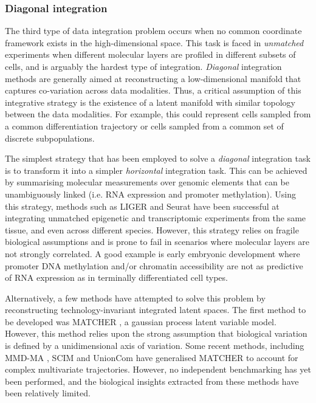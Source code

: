 \subsubsection{Diagonal integration}

The third type of data integration problem occurs when no common coordinate framework exists in the high-dimensional space. This task is faced in \textit{unmatched} experiments when different molecular layers are profiled in different subsets of cells, and is arguably the hardest type of integration. \textit{Diagonal} integration methods are generally aimed at reconstructing a low-dimensional manifold that captures co-variation across data modalities. Thus, a critical assumption of this integrative strategy is the existence of a latent manifold with similar topology between the data modalities. For example, this could represent cells sampled from a common differentiation trajectory or cells sampled from a common set of discrete subpopulations.

The simplest strategy that has been employed to solve a \textit{diagonal} integration task is to transform it into a simpler \textit{horizontal} integration task. This can be achieved by summarising molecular measurements over genomic elements that can be unambiguously linked (i.e. RNA expression and promoter methylation). Using this strategy, methods such as LIGER \cite{Welch2019} and Seurat \cite{Stuart2019b} have been successful at integrating unmatched epigenetic and transcriptomic experiments from the same tissue, and even across different species. However, this strategy relies on fragile biological assumptions and is prone to fail in scenarios where molecular layers are not strongly correlated. A good example is early embryonic development where promoter DNA methylation and/or chromatin accessibility are not as predictive of RNA expression \cite{Argelaguet2019} as in terminally differentiated cell types. 

Alternatively, a few methods have attempted to solve this problem by reconstructing technology-invariant integrated latent spaces. The first method to be developed was MATCHER \cite{Welch2017}, a gaussian process latent variable model. However, this method relies upon the strong assumption that biological variation is defined by a unidimensional axis of variation. Some recent methods, including MMD-MA \cite{Liu2019a}, SCIM \cite{Stark2020} and UnionCom \cite{Cao2020} have generalised MATCHER to account for complex multivariate trajectories. However, no independent benchmarking has yet been performed, and the biological insights extracted from these methods have been relatively limited. 


